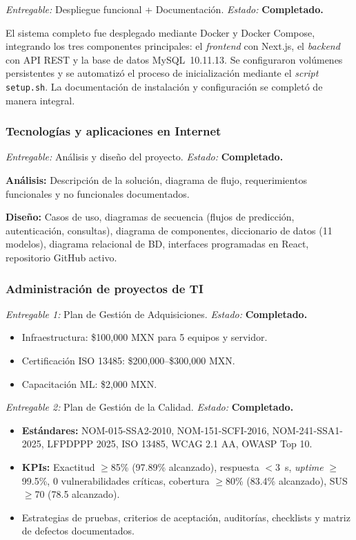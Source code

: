 \documentclass[12pt, letterpaper, twoside]{report}
\begin{document}
\textit{Entregable:} Despliegue funcional + Documentación. \quad \textit{Estado:} \textbf{Completado.}

El sistema completo fue desplegado mediante Docker y Docker Compose, integrando los tres componentes principales: el \textit{frontend} con Next.js, el \textit{backend} con API REST y la base de datos MySQL~10.11.13. Se configuraron volúmenes persistentes y se automatizó el proceso de inicialización mediante el \textit{script} \texttt{setup.sh}. La documentación de instalación y configuración se completó de manera integral.

\subsubsection{Tecnologías y aplicaciones en Internet}

\textit{Entregable:} Análisis y diseño del proyecto. \quad \textit{Estado:} \textbf{Completado.}

\smallskip
\textbf{Análisis:} Descripción de la solución, diagrama de flujo, requerimientos funcionales y no funcionales documentados.

\textbf{Diseño:} Casos de uso, diagramas de secuencia (flujos de predicción, autenticación, consultas), diagrama de componentes, diccionario de datos (11 modelos), diagrama relacional de BD, interfaces programadas en React, repositorio GitHub activo.

\subsubsection{Administración de proyectos de TI}

\textit{Entregable 1:} Plan de Gestión de Adquisiciones. \quad \textit{Estado:} \textbf{Completado.}

\begin{itemize}[leftmargin=1.5cm]
  \item Infraestructura: \$100{,}000 MXN para 5 equipos y servidor.
  \item Certificación ISO 13485: \$200{,}000--\$300{,}000 MXN.
  \item Capacitación ML: \$2{,}000 MXN.
\end{itemize}

\textit{Entregable 2:} Plan de Gestión de la Calidad. \quad \textit{Estado:} \textbf{Completado.}

\begin{itemize}[leftmargin=1.5cm]
  \item \textbf{Estándares:} NOM-015-SSA2-2010, NOM-151-SCFI-2016, NOM-241-SSA1-2025, LFPDPPP 2025, ISO 13485, WCAG 2.1 AA, OWASP Top 10.
  \item \textbf{KPIs:} Exactitud $\geq$85\% (97.89\% alcanzado), respuesta $<$3~s, \textit{uptime} $\geq$99.5\%, 0 vulnerabilidades críticas, cobertura $\geq$80\% (83.4\% alcanzado), SUS $\geq$70 (78.5 alcanzado).
  \item Estrategias de pruebas, criterios de aceptación, auditorías, checklists y matriz de defectos documentados.
\end{itemize}
\end{document}
